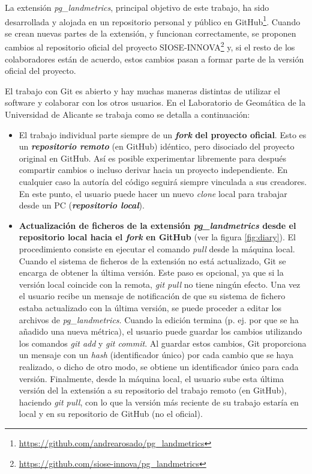 La extensión \textit{pg\_landmetrics}, principal objetivo de este trabajo, ha sido desarrollada y alojada en un repositorio personal y público en GitHub\footnote{\url{https://github.com/andrearosado/pg_landmetrics}}. Cuando se crean nuevas partes de la extensión, y funcionan correctamente, se proponen cambios al repositorio oficial del proyecto SIOSE-INNOVA\footnote{\url{https://github.com/siose-innova/pg_landmetrics}} y, si el resto de los colaboradores están de acuerdo, estos cambios pasan a formar parte de la versión oficial del proyecto.

El trabajo con Git es abierto y hay muchas maneras distintas de utilizar el software y colaborar con los otros usuarios. En el Laboratorio de Geomática de la Universidad de Alicante se trabaja como se detalla a continuación:

\begin{itemize}
\item El trabajo individual parte siempre de un \textbf{\textit{fork} del proyecto oficial}. Esto es un \textbf{\textit{repositorio remoto}} (en GitHub) idéntico, pero disociado del proyecto original en GitHub. Así es posible experimentar libremente para después compartir cambios o incluso derivar hacia un proyecto independiente. En cualquier caso la autoría del código seguirá siempre vinculada a sus creadores. En este punto, el usuario puede hacer un nuevo \textit{clone} local para trabajar desde un PC (\textbf{\textit{repositorio local}}).

\item \textbf{Actualización de ficheros de la extensión \textit{pg\_landmetrics} desde el repositorio local hacia el \textit{fork} en GitHub} (ver la figura \ref{fig:diary}). El procedimiento consiste en ejecutar el comando \textit{pull} desde la máquina local. Cuando el sistema de ficheros de la extensión no está actualizado, Git se encarga de obtener la última versión. Este paso es opcional, ya que si la versión local coincide con la remota, \textit{git pull} no tiene ningún efecto. Una vez el usuario recibe un mensaje de notificación de que su sistema de fichero estaba actualizado con la última versión, se puede proceder a editar los archivos de \textit{pg\_landmetrics}. Cuando la edición termina (p. ej. por que se ha añadido una nueva métrica), el usuario puede guardar los cambios utilizando los comandos \textit{git add} y \textit{git commit}. Al guardar estos cambios, Git proporciona un mensaje con un \textit{hash} (identificador único) por cada cambio que se haya realizado, o dicho de otro modo, se obtiene un identificador único para cada versión. Finalmente, desde la máquina local, el usuario sube esta última versión del la extensión a su repositorio del trabajo remoto (en GitHub), haciendo \textit{git pull}, con lo que la versión más reciente de su trabajo estaría en local y en su repositorio de GitHub (no el oficial).


\end{itemize}
